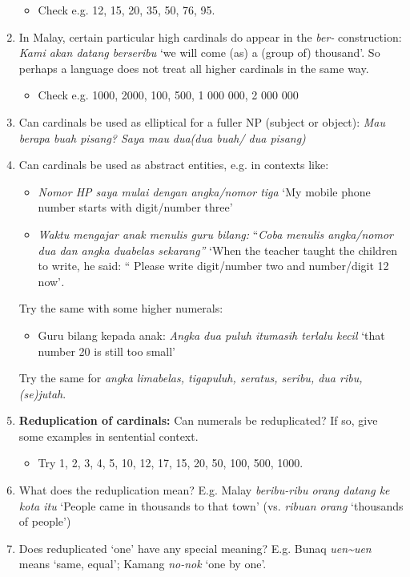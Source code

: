 \begin{enumerate}
\begin{itemize}
\item Check e.g. 12, 15, 20, 35, 50, 76, 95.
\end{itemize}
\item In Malay, certain particular high cardinals do appear in the \textit{ber-} construction: \textit{Kami akan datang berseribu} `we will come (as) a (group of) thousand'. So perhaps a language does not treat all higher cardinals in the same way.
\begin{itemize}
\item Check e.g. 1000, 2000, 100, 500, 1 000 000, 2 000 000
\end{itemize}
\item Can cardinals be used as elliptical for a fuller NP (subject or object): \textit{Mau berapa buah pisang? Saya mau} \textit{dua}\textit{(dua buah/ dua pisang)}
\item Can cardinals be used as abstract entities, e.g. in contexts like:
\begin{itemize}
\item \textit{Nomor HP saya mulai dengan angka/nomor tiga} `My mobile phone number starts with digit/number three'
\item \textit{Waktu mengajar anak menulis guru bilang:} ``\textit{Coba menulis angka/nomor dua dan angka duabelas sekarang''}  `When the teacher taught the children to write, he said: `` Please write digit/number two and number/digit 12 now'\textit{.}
\end{itemize}
Try the same with some higher numerals:
\begin{itemize}
\item Guru bilang kepada anak: \textit{Angka dua puluh itu}\textit{masih terlalu kecil } `that number 20 is still too small'
\end{itemize}
Try the same for \textit{angka} \textit{limabelas, tigapuluh, seratus, seribu, dua ribu, (se)jutah}.
\item  \textbf{Reduplication of cardinals:} Can numerals be reduplicated? If so, give some examples in sentential context.
\begin{itemize}
\item Try 1, 2, 3, 4, 5, 10, 12, 17, 15, 20, 50, 100, 500, 1000.
\end{itemize}
\item What does the reduplication mean? E.g. Malay \textit{beribu-ribu orang datang ke kota itu} `People came in thousands to that town' (vs. \textit{ribuan orang} `thousands of people')
\item Does reduplicated `one' have any special meaning? E.g. Bunaq \textit{uen\~{}uen} means `same, equal'; Kamang \textit{no-nok} `one by one'.

\end{enumerate}
